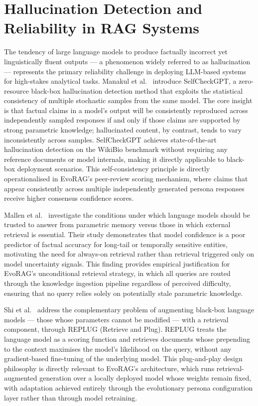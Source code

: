 \section{Hallucination Detection and Reliability in RAG Systems}

The tendency of large language models to produce factually incorrect yet
linguistically fluent outputs — a phenomenon widely referred to as hallucination —
represents the primary reliability challenge in deploying LLM-based systems for
high-stakes analytical tasks.
Manakul et al.~\cite{manakul2023selfcheckgpt} introduce SelfCheckGPT, a zero-resource
black-box hallucination detection method that exploits the statistical consistency
of multiple stochastic samples from the same model.
The core insight is that factual claims in a model's output will be consistently
reproduced across independently sampled responses if and only if those claims are
supported by strong parametric knowledge; hallucinated content, by contrast, tends
to vary inconsistently across samples.
SelfCheckGPT achieves state-of-the-art hallucination detection on the WikiBio
benchmark without requiring any reference documents or model internals, making it
directly applicable to black-box deployment scenarios.
This self-consistency principle is directly operationalised in EvoRAG's peer-review
scoring mechanism, where claims that appear consistently across multiple independently
generated persona responses receive higher consensus confidence scores.

Mallen et al.~\cite{mallen2023trust} investigate the conditions under which language
models should be trusted to answer from parametric memory versus those in which
external retrieval is essential.
Their study demonstrates that model confidence is a poor predictor of factual
accuracy for long-tail or temporally sensitive entities, motivating the need for
always-on retrieval rather than retrieval triggered only on model uncertainty signals.
This finding provides empirical justification for EvoRAG's unconditional retrieval
strategy, in which all queries are routed through the knowledge ingestion pipeline
regardless of perceived difficulty, ensuring that no query relies solely on
potentially stale parametric knowledge.

Shi et al.~\cite{shi2023replug} address the complementary problem of augmenting
black-box language models — those whose parameters cannot be modified — with a
retrieval component, through REPLUG (Retrieve and Plug).
REPLUG treats the language model as a scoring function and retrieves documents
whose prepending to the context maximises the model's likelihood on the query,
without any gradient-based fine-tuning of the underlying model.
This plug-and-play design philosophy is directly relevant to EvoRAG's architecture,
which runs retrieval-augmented generation over a locally deployed model whose
weights remain fixed, with adaptation achieved entirely through the evolutionary
persona configuration layer rather than through model retraining.

